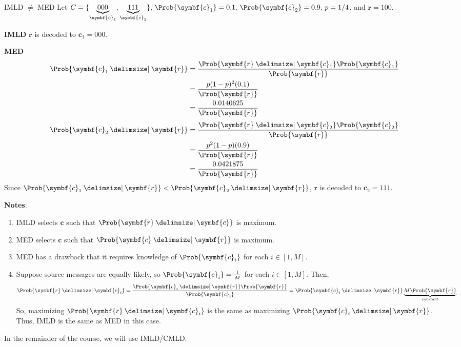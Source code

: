 \begin{Example}{IMLD $ \neq $ MED}{}
    Let $ C=\set{\underbrace{000}_{\symbf{c}_1},\underbrace{111}_{\symbf{c}_2}},\,
        \Prob{\symbf{c}_1}=0.1,\, \Prob{\symbf{c}_2}=0.9,\, p=1/4 $, and $ \symbf{r}=100 $.

    \textbf{IMLD} $ \symbf{r} $ is decoded to $ \symbf{c}_1 = 000 $.

    \textbf{MED}
    \begin{align*}
        \Prob{\symbf{c}_1\given \symbf{r}}
         & =\frac{\Prob{\symbf{r}\given \symbf{c}_1}\Prob{\symbf{c}_1}}{\Prob{\symbf{r}}} \\
         & =\frac{p(1-p)^2(0.1)}{\Prob{\symbf{r}}}                                        \\
         & =\frac{0.0140625}{\Prob{\symbf{r}}}
    \end{align*}
    \begin{align*}
        \Prob{\symbf{c}_2\given \symbf{r}}
         & =\frac{\Prob{\symbf{r}\given \symbf{c}_2}\Prob{\symbf{c}_2}}{\Prob{\symbf{r}}} \\
         & =\frac{p^2(1-p)(0.9)}{\Prob{\symbf{r}}}                                        \\
         & =\frac{0.0421875}{\Prob{\symbf{r}}}
    \end{align*}
    Since $ \Prob{\symbf{c}_1\given \symbf{r}}<\Prob{\symbf{c}_2\given \symbf{r}} $,
    $ \symbf{r} $ is decoded to $ \symbf{c}_2=111 $.
\end{Example}


\textbf{Notes}:
\begin{enumerate}[label=(\roman*)]
    \item IMLD selects $ \symbf{c} $ such that $ \Prob{\symbf{r}\given \symbf{c}} $ is maximum.
    \item MED selects $ \symbf{c} $ such that $ \Prob{\symbf{c}\given \symbf{r}} $ is maximum.
    \item MED has a drawback that it requires knowledge of $ \Prob{\symbf{c}_i} $ for
          each $ i\in [1,M] $.
    \item Suppose source messages are equally likely, so
          $ \Prob{\symbf{c}_i}=\frac{1}{M} $ for each $ i\in[1,M] $.
          Then,
          \[ \Prob{\symbf{r}\given \symbf{c}_i}=\frac{\Prob{\symbf{c}_i\given \symbf{r}}\Prob{\symbf{r}}}{\Prob{\symbf{c}_i}}
              =\Prob{\symbf{c}_i\given \symbf{r}} \underbrace{M \Prob{\symbf{r}}}_{\text{constant}}\]
          So, maximizing $ \Prob{\symbf{r}\given \symbf{c}_i} $ is the same as maximizing
          $ \Prob{\symbf{c}_i\given \symbf{r}} $. Thus, IMLD is the same as MED in this case.
\end{enumerate}
In the remainder of the course, we will use IMLD/CMLD\@.
